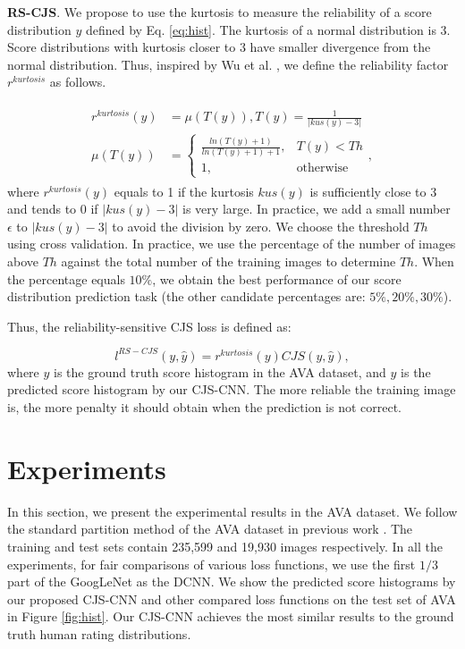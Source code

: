 \documentclass[letterpaper]{article} %
\begin{document}
\textbf{RS-CJS}. We propose to use the kurtosis to measure the reliability of a score distribution $y$ defined by Eq. \ref{eq:hist}. The kurtosis of a normal distribution is 3. Score distributions with kurtosis closer to 3 have smaller divergence from the normal distribution. Thus, inspired by Wu et al. \cite{WuICCV2011}, we define the reliability factor $r^{kurtosis}$ as follows.


\begin{eqnarray}
\begin{split}
r^{kurtosis}(y) & = \mu(T(y)), T(y) = \frac{1}{|kus(y)-3|}\\
\mu(T(y)) & =
\begin{cases}
  \frac{ln(T(y)+1)}{ln(T(y)+1)+1}, & T(y)<Th  \\
  1,  & \text{otherwise}
\end{cases},
\label{eq:r_kus}
\end{split}
\end{eqnarray}
where $r^{kurtosis}(y)$ equals to 1 if the kurtosis $kus(y)$ is sufficiently close to 3 and tends to 0 if $|kus(y)-3|$ is very large. In practice, we add a small number $\epsilon$ to $|kus(y)-3|$ to avoid the division by zero. We choose the threshold $Th$ using cross validation.
In practice, we use the percentage of the number of images above $Th$ against the total number of the training images to determine $Th$. When the percentage equals $10\%$, we obtain the best performance of our score distribution prediction task (the other candidate percentages are: $5\%, 20\%, 30\%$).





Thus, the reliability-sensitive CJS loss is defined as:

\begin{equation}
l^{RS-CJS}(y,\hat{y}) = r^{kurtosis}(y) CJS(y,\hat{y}),
\label{eq:RS-CJS}
\end{equation}
where $y$ is the ground truth score histogram in the AVA dataset, and $\hat{y}$ is the predicted score histogram by our CJS-CNN. The more reliable the training image is, the more penalty it should obtain when the prediction is not correct.


\section{Experiments}
In this section, we present the experimental results in the AVA dataset. We follow the standard partition method of the AVA dataset in previous work
\cite{MurrayCVPR2012,WangSP2016,KongECCV2016,LuTMM2015,LuICCV2015,MaiCVPR2016}
. The training and test sets contain 235,599 and 19,930 images respectively. In all the experiments, for fair comparisons of various loss functions, we use the first $1/3$ part of the GoogLeNet as the DCNN. We show the predicted score histograms by our proposed CJS-CNN and other compared loss functions on the test set of AVA in Figure \ref{fig:hist}. Our CJS-CNN achieves the most similar results to the ground truth human rating distributions.
\end{document}
